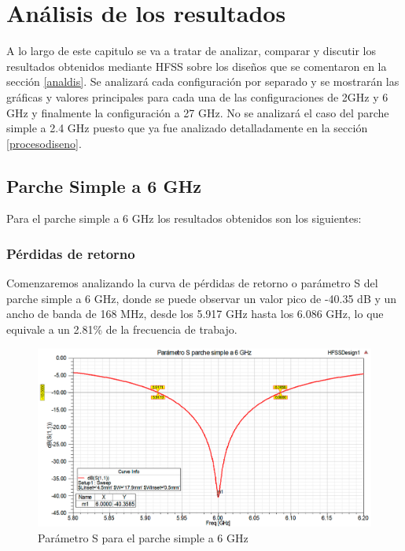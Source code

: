 \chapter{Análisis de los resultados}
\label{resultados}

A lo largo de este capitulo se va a tratar de analizar, comparar y discutir los resultados obtenidos mediante HFSS sobre los diseños que se comentaron en la sección \ref{analdis}. Se analizará cada configuración por separado y se mostrarán las gráficas y valores principales para cada una de las configuraciones de 2GHz y 6 GHz y finalmente la configuración a 27 GHz. No se analizará el caso del parche simple a 2.4 GHz puesto que ya fue analizado detalladamente en la sección \ref{procesodiseno}.

\section{Parche Simple a 6 GHz}
\par Para el parche simple a 6 GHz los resultados obtenidos son los siguientes:

\subsection{Pérdidas de retorno}
\par Comenzaremos analizando la curva de pérdidas de retorno o parámetro S del parche simple a 6 GHz, donde se puede observar un valor pico de -40.35 dB y un ancho de banda de 168 MHz, desde los 5.917 GHz hasta los 6.086 GHz, lo que equivale a un 2.81\% de la frecuencia de trabajo.
\\
\begin{figure}[H]
    \centering
        \includegraphics[width=\textwidth]{archivos/analisis/1x12/1}
        \caption{Parámetro S para el parche simple a 6 GHz}
        \label{fig:s1x12}
\end{figure}

